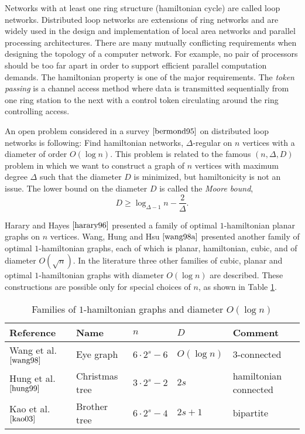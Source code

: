\documentclass[10pt,a4paper]{article}
\newcommand{\rz}{\vspace{0.1cm}}
\begin{document}
Networks with at least one ring structure (hamiltonian cycle) are
called loop networks. Distributed loop networks are extensions of
ring networks and are widely used in the design and implementation
of local area networks and parallel processing architectures. There
are many mutually conflicting requirements when designing the
topology of a computer network. For example, no pair of processors
should be too far apart in order to support efficient parallel
computation demands. The hamiltonian property is one of the major
requirements. The \emph{token passing} is a channel access method
where data is transmitted sequentially from one ring station to the
next with a control token circulating around the ring controlling
access. \rz

An open problem considered in a survey $\cite{bermond95}$ on
distributed loop networks is following: Find hamiltonian networks,
$\Delta$-regular on $n$ vertices with a diameter of order $O (\log
n)$. This problem is related to the famous $(n, \Delta, D)$ problem
in which we want to construct a graph of $n$ vertices with maximum
degree $\Delta$ such that the diameter $D$ is minimized, but
hamiltonicity is not an issue. The lower bound on the diameter $D$
is called the \emph{Moore bound},
$$D \geqslant \log_{\Delta - 1} n - \frac{2}{\Delta}.$$




Harary and Hayes $\cite{harary96}$ presented a family of optimal
$1$-hamiltonian planar graphs on $n$ vertices. Wang, Hung and Hsu
$\cite{wang98a}$ presented another family of optimal $1$-hamiltonian
graphs, each of which is planar, hamiltonian, cubic, and of diameter
$O (\sqrt{n})$. In the literature three other families of cubic,
planar and optimal $1$-hamiltonian graphs with diameter $O (\log n)$
are described. These constructions are possible only for special
choices of $n$, as shown in Table \ref{optimalGraphs}. \rz

\begin{table}[ht]
\centering \small
    \begin{tabular}{ l l l l l }
    \toprule

    Reference & Name & $n$ & $D$ & Comment \\[0.5ex]
    \midrule
    Wang et al. $\cite{wang98}$ & Eye graph & $6 \cdot 2^s - 6$ & $O (\log n)$ & $3$-connected \\
    Hung et al. $\cite{hung99}$ & Christmas tree & $3 \cdot 2^s - 2$ & $2s$ & hamiltonian connected \\
    Kao et al. $\cite{kao03}$ & Brother tree & $6 \cdot 2^s - 4$ & $2s + 1$ & bipartite
    \\ [0.5ex]
        \bottomrule
    \end{tabular}
\label{optimalGraphs}

\caption{Families of $1$-hamiltonian graphs and diameter $O (\log
n)$}
\end{table}
\end{document}
